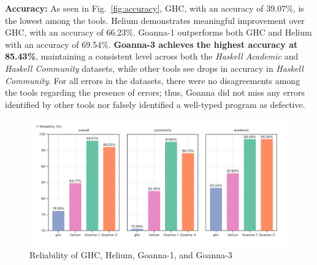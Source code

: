 \documentclass[pdflatex,lineno,sn-nature,Numbered]{sn-jnl}%
\begin{document}
\textbf{Accuracy:} As seen in Fig.~\ref{fig:accuracy}, GHC, with an accuracy of 39.07\%, is the lowest among the tools. Helium demonstrates meaningful improvement over GHC, with an accuracy of 66.23\%. Goanna-1 outperforms both GHC and Helium with an accuracy of 69.54\%. \textbf{Goanna-3 achieves the highest accuracy at 85.43\%}, maintaining a consistent level across both the \textit{Haskell Academic} and \textit{Haskell Community} datasets, while other tools see drops in accuracy in \textit{Haskell Community}. For all errors in the datasets, there were no disagreements among the tools regarding the presence of errors; thus, Goanna did not miss any errors identified by other tools nor falsely identified a well-typed program as defective.

    \begin{figure}
        \centering
        \includegraphics[width=\linewidth]{images/Reliability.png}
        \caption{Reliability of GHC, Helium, Goanna-1, and Goanna-3}
        \label{fig:reliability}
    \end{figure}
\end{document}
